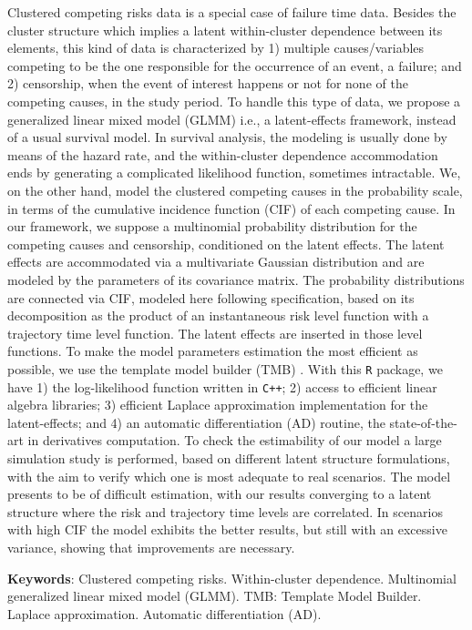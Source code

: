 \documentclass[12pt, %
               openright, %
               oneside, %
               a4paper, %
               chapter=TITLE, %
               section=TITLE, %
               brazil,
               english %
]{abntex2}
\begin{document}
\begin{resumo}[]
  Clustered competing risks data is a special case of failure time
  data. Besides the cluster structure which implies a latent
  within-cluster dependence between its elements, this kind of data is
  characterized by 1) multiple causes/variables competing to be the one
  responsible for the occurrence of an event, a failure; and 2)
  censorship, when the event of interest happens or not for none of the
  competing causes, in the study period. To handle this type of data, we
  propose a generalized linear mixed model (GLMM) i.e., a latent-effects
  framework, instead of a usual survival model. In survival analysis,
  the modeling is usually done by means of the hazard rate, and the
  within-cluster dependence accommodation ends by generating a
  complicated likelihood function, sometimes intractable. We, on the
  other hand, model the clustered competing causes in the probability
  scale, in terms of the cumulative incidence function (CIF) of each
  competing cause. In our framework, we suppose a multinomial
  probability distribution for the competing causes and censorship,
  conditioned on the latent effects. The latent effects are accommodated
  via a multivariate Gaussian distribution and are modeled by the
  parameters of its covariance matrix. The probability distributions are
  connected via CIF, modeled here following 
  specification, based on its decomposition as the product of an
  instantaneous risk level function with a trajectory time level
  function. The latent effects are inserted in those level functions. To
  make the model parameters estimation the most efficient as possible,
  we use the template model builder (TMB) \cite{TMB}. With this
  \texttt{R} \cite{R21} package, we have 1) the log-likelihood function
  written in \texttt{C++}; 2) access to efficient linear algebra
  libraries; 3) efficient Laplace approximation implementation for the
  latent-effects; and 4) an automatic differentiation (AD) routine, the
  state-of-the-art in derivatives computation. To check the estimability
  of our model a large simulation study is performed, based on different
  latent structure formulations, with the aim to verify which one is
  most adequate to real scenarios. The model presents to be of difficult
  estimation, with our results converging to a latent structure where
  the risk and trajectory time levels are correlated. In scenarios with
  high CIF the model exhibits the better results, but still with an
  excessive variance, showing that improvements are necessary.

  \vfill
  \textbf{Keywords}: Clustered competing risks.
                     Within-cluster dependence.
                     Multinomial generalized linear mixed model (GLMM).
                     TMB: Template Model Builder.
                     Laplace approximation.
                     Automatic differentiation (AD).
\end{resumo}
\end{document}
